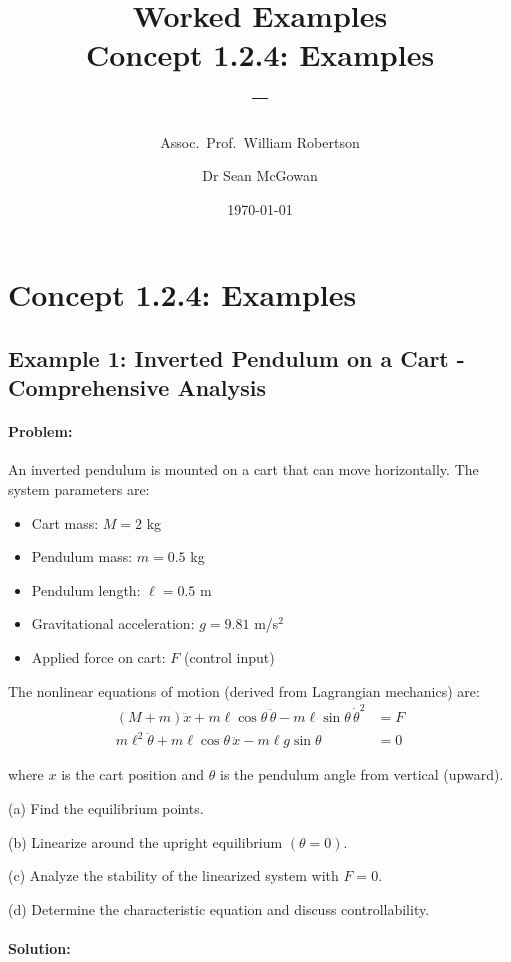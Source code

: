 \documentclass[11pt,a4paper]{article}
\title{\textbf{Worked Examples}\\[0.5em]
\large Concept 1.2.4: Examples\\[0.3em]
\normalsize \coursesubtitle{} -- \coursetitle}
\author{Assoc.\ Prof.\ William Robertson \and Dr Sean McGowan}
\date{\today}
\begin{document}
\maketitle
\tableofcontents
\newpage

\section{Concept 1.2.4: Examples}

\subsection{Example 1: Inverted Pendulum on a Cart - Comprehensive Analysis}

\paragraph{Problem:} An inverted pendulum is mounted on a cart that can move horizontally. The system parameters are:
\begin{itemize}
  \item Cart mass: $M = 2$ kg
  \item Pendulum mass: $m = 0.5$ kg
  \item Pendulum length: $\ell = 0.5$ m
  \item Gravitational acceleration: $g = 9.81$ m/s$^2$
  \item Applied force on cart: $F$ (control input)
\end{itemize}

The nonlinear equations of motion (derived from Lagrangian mechanics) are:
\begin{align}
  (M + m)\ddot{x} + m\ell\cos\theta\,\ddot{\theta} - m\ell\sin\theta\,\dot{\theta}^2 &= F \\
  m\ell^2\ddot{\theta} + m\ell\cos\theta\,\ddot{x} - m\ell g\sin\theta &= 0
\end{align}

where $x$ is the cart position and $\theta$ is the pendulum angle from vertical (upward).

(a) Find the equilibrium points.

(b) Linearize around the upright equilibrium $(\theta = 0)$.

(c) Analyze the stability of the linearized system with $F = 0$.

(d) Determine the characteristic equation and discuss controllability.

\paragraph{Solution:}
\end{document}
